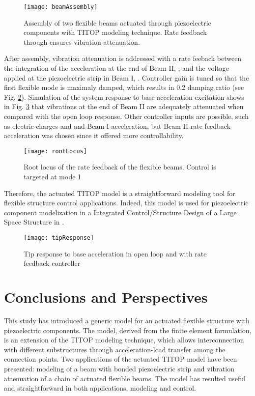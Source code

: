 \documentclass{ifacconf}
\begin{document}
\begin{figure} 
 \center
\texttt{[image: beamAssembly]}
\caption{Assembly of two flexible beams actuated through piezoelectric components with TITOP modeling technique. Rate feedback through  ensures vibration attenuation.}
\label{fig:beamAssembly}
\end{figure}

After assembly, vibration attenuation is addressed with a rate feeback between the integration of the acceleration at the end of Beam II, , and the voltage applied at the piezoelectric strip in Beam I, . Controller gain is tuned so that the first flexible mode is maximaly damped, which results in 0.2 damping ratio (see Fig. \ref{fig:rootLocus}). Simulation of the system response to base acceleration excitation shows in Fig. \ref{fig:tipResponse} that vibrations at the end of Beam II are adequately attenuated when compared with the open loop response. Other controller inputs are possible, such as electric charges  and  and Beam I acceleration, but Beam II rate feedback acceleration was chosen since it offered more controllability. 

 \begin{figure} 
\texttt{[image: rootLocus]}
\caption{Root locus of the rate feedback of the flexible beams. Control is targeted at mode 1}
\label{fig:rootLocus}
\end{figure}

Therefore, the actuated TITOP model is a straightforward modeling tool for flexible structure control applications. Indeed, this model is used for piezoelectric component modelization in a Integrated Control/Structure Design of a Large Space Structure in \cite{Perez2016_ID}.


\begin{figure} 
\center
\texttt{[image: tipResponse]}
\caption{Tip response to base acceleration in open loop and with rate feedback controller}
\label{fig:tipResponse}
\end{figure}



\section{Conclusions and Perspectives}


This study has introduced a generic model for an actuated flexible structure with piezoelectric components. The model, derived from the finite element formulation, is an extension of the TITOP modeling technique, which allows interconnection with different substructures through acceleration-load transfer among the connection points. Two applications of the actuated TITOP model have been presented: modeling of a beam with bonded piezoelectric strip and vibration attenuation of a chain of actuated flexible beams. The model has resulted useful and straightforward in both applications, modeling and control.
\end{document}
